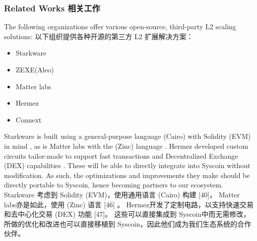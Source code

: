 \documentclass{ctexart}
\begin{document}
\subsubsection{Related Works 相关工作}

The following organizations offer various open-source, third-party L2 scaling solutions:
以下组织提供各种开源的第三方 L2 扩展解决方案：

\begin{itemize}
\item Starkware 
\item ZEXE(Aleo) 
\item Matter labs 
\item Hermez
\item Connext 
\end{itemize}

Starkware is built using a general-purpose language (Cairo) with Solidity (EVM) in mind \cite{Sta20b}, as is Matter labs with the (Zinc) language \cite{matter21}. Hermez developed custom circuits tailor-made to support fast transactions and Decentralized Exchange (DEX) capabilities \cite{hermez21}. These will be able to directly integrate into Syscoin without modification. As such, the optimizations and improvements they make should be directly portable to Syscoin, hence becoming partners to our ecosystem. Starkware 考虑到 Solidity (EVM)，使用通用语言 (Cairo) 构建 [40]， Matter labs亦是如此，使用 (Zinc) 语言 [46] 。 Hermez开发了定制电路，以支持快速交易和去中心化交易 (DEX) 功能 [47]。 这些可以直接集成到 Syscoin中而无需修改，所做的优化和改进也可以直接移植到 Syscoin，因此他们成为我们生态系统的合作伙伴。
\end{document}
